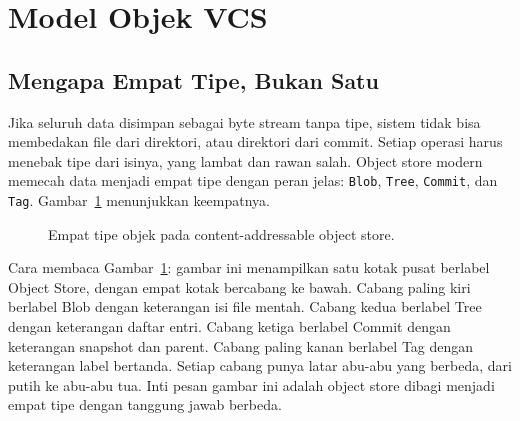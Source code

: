 \documentclass[11pt,a4paper]{article}
\begin{document}
\section{Model Objek VCS}

\subsection{Mengapa Empat Tipe, Bukan Satu}

Jika seluruh data disimpan sebagai byte stream tanpa tipe, sistem tidak bisa membedakan file dari direktori, atau direktori dari commit. Setiap operasi harus menebak tipe dari isinya, yang lambat dan rawan salah. Object store modern memecah data menjadi empat tipe dengan peran jelas: \texttt{Blob}, \texttt{Tree}, \texttt{Commit}, dan \texttt{Tag}. Gambar~\ref{fig:types} menunjukkan keempatnya.

\begin{figure}[H]
	\centering
	\caption{Empat tipe objek pada content-addressable object store.}
	\label{fig:types}
\end{figure}

Cara membaca Gambar~\ref{fig:types}: gambar ini menampilkan satu kotak pusat berlabel Object Store, dengan empat kotak bercabang ke bawah. Cabang paling kiri berlabel Blob dengan keterangan isi file mentah. Cabang kedua berlabel Tree dengan keterangan daftar entri. Cabang ketiga berlabel Commit dengan keterangan snapshot dan parent. Cabang paling kanan berlabel Tag dengan keterangan label bertanda. Setiap cabang punya latar abu-abu yang berbeda, dari putih ke abu-abu tua. Inti pesan gambar ini adalah object store dibagi menjadi empat tipe dengan tanggung jawab berbeda.
\end{document}
